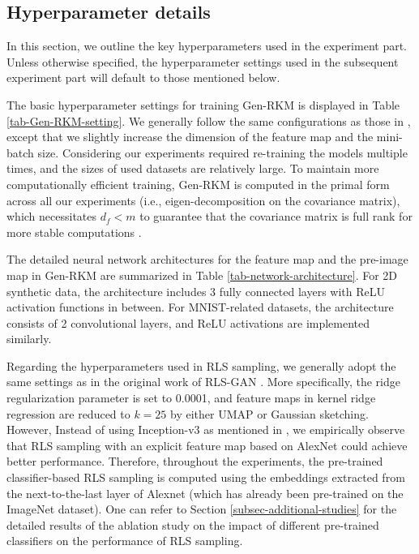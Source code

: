 \subsection{Hyperparameter details}
\label{subsec-setup-hyperparameter}
In this section, we outline the key hyperparameters used in the experiment part. Unless otherwise specified, the hyperparameter settings used in the subsequent experiment part will default to those mentioned below.
\begin{description}[leftmargin=0pt]
    \item[Hyperparameters for Gen-RKM ] The basic hyperparameter settings for training Gen-RKM is displayed in Table \ref{tab-Gen-RKM-setting}. We generally follow the same configurations as those in \cite{pandeyGenerativeRestrictedKernel2021}, except that we slightly increase the dimension of the feature map and the mini-batch size. Considering our experiments required re-training the models multiple times, and the sizes of used datasets are relatively large. To maintain more computationally efficient training, Gen-RKM is computed in the primal form across all our experiments (i.e., eigen-decomposition on the covariance matrix), which necessitates $d_f < m$ to guarantee that the covariance matrix is full rank for more stable computations \cite{pandeyGenerativeRestrictedKernel2021}.
    

    \item[Neural network architectures] The detailed neural network architectures for the feature map and the pre-image map in Gen-RKM are summarized in Table \ref{tab-network-architecture}. For 2D synthetic data, the architecture includes 3 fully connected layers with ReLU activation functions in between. For MNIST-related datasets, the architecture consists of 2 convolutional layers, and ReLU activations are implemented similarly.
    

    \item[Hyperparameters for RLS sampling] Regarding the hyperparameters used in RLS sampling, we generally adopt the same settings as in the original work of RLS-GAN \cite{schreursLeverageScoreSampling2022}. More specifically, the ridge regularization parameter is set to 0.0001, and feature maps in kernel ridge regression are reduced to $k=25$ by either UMAP or Gaussian sketching. However, Instead of using Inception-v3 as mentioned in \cite{schreursLeverageScoreSampling2022}, we empirically observe that RLS sampling with an explicit feature map based on AlexNet could achieve better performance. Therefore, throughout the experiments, the pre-trained classifier-based RLS sampling is computed using the embeddings extracted from the next-to-the-last layer of Alexnet (which has already been pre-trained on the ImageNet dataset). One can refer to Section \ref{subsec-additional-studies} for the detailed results of the ablation study on the impact of different pre-trained classifiers on the performance of RLS sampling.


\end{description}
